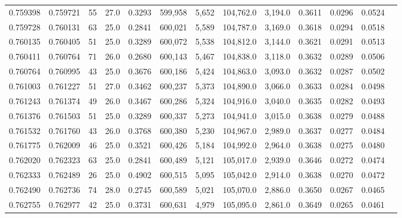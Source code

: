 \begin{tabular}{rrrrrrrrrrrrr}
0.759398 & 0.759721 &    55 & 27.0 &                                     0.3293 & 599,958 &   5,652 & 104,762.0 &   3,194.0 & 0.3611 & 0.0296 & 0.0524 \\
0.759728 & 0.760131 &    63 & 25.0 &                                     0.2841 & 600,021 &   5,589 & 104,787.0 &   3,169.0 & 0.3618 & 0.0294 & 0.0518 \\
0.760135 & 0.760405 &    51 & 25.0 &                                     0.3289 & 600,072 &   5,538 & 104,812.0 &   3,144.0 & 0.3621 & 0.0291 & 0.0513 \\
0.760411 & 0.760764 &    71 & 26.0 &                                     0.2680 & 600,143 &   5,467 & 104,838.0 &   3,118.0 & 0.3632 & 0.0289 & 0.0506 \\
0.760764 & 0.760995 &    43 & 25.0 &                                     0.3676 & 600,186 &   5,424 & 104,863.0 &   3,093.0 & 0.3632 & 0.0287 & 0.0502 \\
0.761003 & 0.761227 &    51 & 27.0 &                                     0.3462 & 600,237 &   5,373 & 104,890.0 &   3,066.0 & 0.3633 & 0.0284 & 0.0498 \\
0.761243 & 0.761374 &    49 & 26.0 &                                     0.3467 & 600,286 &   5,324 & 104,916.0 &   3,040.0 & 0.3635 & 0.0282 & 0.0493 \\
0.761376 & 0.761503 &    51 & 25.0 &                                     0.3289 & 600,337 &   5,273 & 104,941.0 &   3,015.0 & 0.3638 & 0.0279 & 0.0488 \\
0.761532 & 0.761760 &    43 & 26.0 &                                     0.3768 & 600,380 &   5,230 & 104,967.0 &   2,989.0 & 0.3637 & 0.0277 & 0.0484 \\
0.761775 & 0.762009 &    46 & 25.0 &                                     0.3521 & 600,426 &   5,184 & 104,992.0 &   2,964.0 & 0.3638 & 0.0275 & 0.0480 \\
0.762020 & 0.762323 &    63 & 25.0 &                                     0.2841 & 600,489 &   5,121 & 105,017.0 &   2,939.0 & 0.3646 & 0.0272 & 0.0474 \\
0.762333 & 0.762489 &    26 & 25.0 &                                     0.4902 & 600,515 &   5,095 & 105,042.0 &   2,914.0 & 0.3638 & 0.0270 & 0.0472 \\
0.762490 & 0.762736 &    74 & 28.0 &                                     0.2745 & 600,589 &   5,021 & 105,070.0 &   2,886.0 & 0.3650 & 0.0267 & 0.0465 \\
0.762755 & 0.762977 &    42 & 25.0 &                                     0.3731 & 600,631 &   4,979 & 105,095.0 &   2,861.0 & 0.3649 & 0.0265 & 0.0461 \\

\end{tabular}
